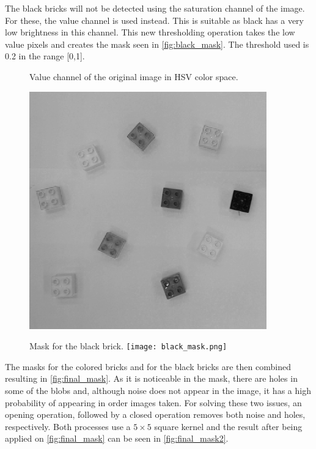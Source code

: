 The black bricks will not be detected using the saturation channel of the image. For these, the value channel is used instead. This is suitable as black has a very low brightness in this channel. This new thresholding operation takes the low value pixels and creates the mask seen in \autoref{fig:black_mask}. The threshold used is 0.2 in the range [0,1].
\begin{figure}[H]
	\captionbox  %
	{
		Value channel of the original image in HSV color space.                
		\label{fig:value}                                  
	}                                                                 
	{       
		
		\includegraphics[width=.25\textwidth]{figures/value.png}         
	}                                                                    
	\hspace{5pt}                                                          
	\captionbox
	{  
		Mask for the black brick.
		\label{fig:black_mask}                                     
	}
	{
		\texttt{[image: black\_mask.png]}            
	}                                                                             
\end{figure}
The masks for the colored bricks and for the black bricks are then combined resulting in \autoref{fig:final_mask}. As it is noticeable in the mask, there are holes in some of the blobs and, although noise does not appear in the image, it has a high probability of appearing in order images taken. For solving these two issues, an opening operation, followed by a closed operation removes both noise and holes, respectively. Both processes use a $5\times 5$ square kernel and the result after being applied on \autoref{fig:final_mask} can be seen in \autoref{fig:final_mask2}. 
%
